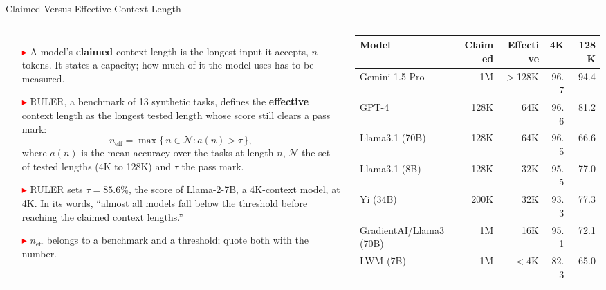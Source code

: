 \begin{frame}{Claimed Versus Effective Context Length}
  \begin{columns}[T,onlytextwidth]
      \begin{itemize}\footnotesize\itemsep0.4em
        \item[\textcolor{red}{$\blacktriangleright$}] A model's \textbf{claimed} context length is the longest input it accepts, $n$ tokens. It states a capacity; how much of it the model uses has to be measured.
        \item[\textcolor{red}{$\blacktriangleright$}] RULER, a benchmark of 13 synthetic tasks, defines the \textbf{effective} context length as the longest tested length whose score still clears a pass mark:
          \[ n_{\text{eff}} = \max\{\, n \in \mathcal{N} : a(n) > \tau \,\}, \]
          where $a(n)$ is the mean accuracy over the tasks at length $n$, $\mathcal{N}$ the set of tested lengths (4K to 128K) and $\tau$ the pass mark.
        \item[\textcolor{red}{$\blacktriangleright$}] RULER sets $\tau = 85.6\%$, the score of Llama-2-7B, a 4K-context model, at 4K. In its words, ``almost all models fall below the threshold before reaching the claimed context lengths.''
        \item[\textcolor{red}{$\blacktriangleright$}] $n_{\text{eff}}$ belongs to a benchmark and a threshold; quote both with the number.
      \end{itemize}
      \centering
      \vspace{0.6em}
      {\scriptsize
      \setlength{\tabcolsep}{3.5pt}\begin{tabular}{lrrrr}
        \toprule
        \textbf{Model} & \textbf{Claimed} & \textbf{Effective} & \textbf{4K} & \textbf{128K} \\
        \midrule
        Gemini-1.5-Pro & 1M & $>$128K & 96.7 & 94.4 \\
        GPT-4 & 128K & 64K & 96.6 & 81.2 \\
        Llama3.1 (70B) & 128K & 64K & 96.5 & 66.6 \\
        Llama3.1 (8B) & 128K & 32K & 95.5 & 77.0 \\
        Yi (34B) & 200K & 32K & 93.3 & 77.3 \\
        GradientAI/Llama3 (70B) & 1M & 16K & 95.1 & 72.1 \\
        LWM (7B) & 1M & $<$4K & 82.3 & 65.0 \\
        \bottomrule
      \end{tabular}\par}

\end{columns}
\end{frame}
